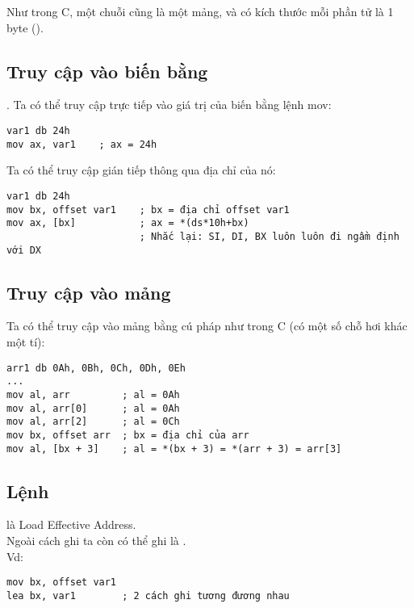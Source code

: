 \documentclass[main.tex]{subfiles}
\begin{document}
Như trong C, một chuỗi cũng là một mảng, và có kích thước mỗi phần tử là 1 byte ().

\subsection{Truy cập vào biến bằng }.
Ta có thể truy cập trực tiếp vào giá trị của biến bằng lệnh mov:
\begin{verbatim}
var1 db 24h
mov ax, var1    ; ax = 24h
\end{verbatim}
Ta có thể truy cập gián tiếp thông qua địa chỉ của nó:
\begin{verbatim}
var1 db 24h            
mov bx, offset var1    ; bx = địa chỉ offset var1
mov ax, [bx]           ; ax = *(ds*10h+bx) 
                       ; Nhắc lại: SI, DI, BX luôn luôn đi ngầm định với DX
\end{verbatim}

\subsection{Truy cập vào mảng}
Ta có thể truy cập vào mảng bằng cú pháp như trong C (có một số chỗ hơi khác một tí):
\begin{verbatim}
arr1 db 0Ah, 0Bh, 0Ch, 0Dh, 0Eh 
... 
mov al, arr         ; al = 0Ah 
mov al, arr[0]      ; al = 0Ah 
mov al, arr[2]      ; al = 0Ch 
mov bx, offset arr  ; bx = địa chỉ của arr
mov al, [bx + 3]    ; al = *(bx + 3) = *(arr + 3) = arr[3]
\end{verbatim}

\subsection{Lệnh }
 là Load Effective Address.\\
Ngoài cách ghi  ta còn có thể ghi là .\\
Vd:
\begin{verbatim}
mov bx, offset var1 
lea bx, var1        ; 2 cách ghi tương đương nhau
\end{verbatim}
\end{document}
